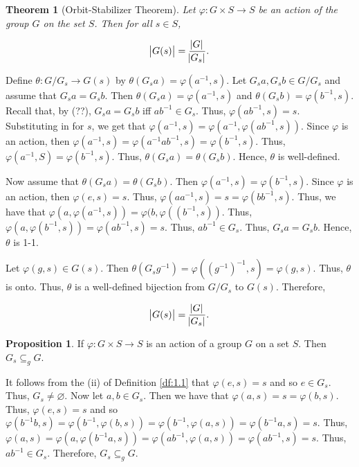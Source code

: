 \documentclass{article}
\makeatletter
\newtheorem{theorem}{Theorem}[section]
\theoremstyle{definition}
\newtheorem{prop}{Proposition}[section]
\theoremstyle{remark}
\let\oldproofname=\proofname
\renewcommand{\proofname}{\bf{\textit{\oldproofname}}}
\theoremstyle{definition}
\renewenvironment{proof}[1][\proofname]{\par
  \pushQED{\qed}%
  \normalfont \topsep6\p@\@plus6\p@\relax
  \list{}{\leftmargin=0mm
          \rightmargin=0mm
          \settowidth{\itemindent}{\itshape#1}%
          \labelwidth=4mm
          \parsep=0pt \listparindent=0mm%
  }
  \item[\hskip\labelsep
        \itshape
    #1\@addpunct{.}]\ignorespaces
}{%
  \popQED\endlist\@endpefalse
}
\makeatother
\begin{document}
    \begin{theorem}[Orbit-Stabilizer Theorem]\label{thm:1.1}
        Let $\varphi\colon G\times S\rightarrow S$ be an action of the group $G$ on the set $S$. Then for all $s\in S$, 
        
        \begin{equation*}
            \abs{G(s)}=\frac{\abs{G}}{\abs{G_s}}.
        \end{equation*}
    \end{theorem}
        \begin{proof}
            Define $\theta\colon G/G_s\rightarrow G(s)$ by $\theta(G_sa)=\varphi(a^{-1},s)$. Let $G_sa,G_sb\in G/G_s$ and assume that $G_sa=G_sb$. Then $\theta(G_sa)=\varphi(a^{-1},s)$ and $\theta(G_sb)=\varphi(b^{-1},s)$. Recall that, by (??), $G_sa=G_sb$ iff $ab^{-1}\in G_s$. Thus, $\varphi(ab^{-1},s)=s$. Substituting in for $s$, we get that $\varphi(a^{-1},s)=\varphi(a^{-1},\varphi(ab^{-1},s))$. Since $\varphi$ is an action, then $\varphi(a^{-1},s)=\varphi(a^{-1}ab^{-1},s)=\varphi(b^{-1},s)$. Thus, $\varphi(a^{-1}, S)=\varphi(b^{-1},s)$. Thus, $\theta(G_sa)=\theta(G_sb)$. Hence, $\theta$ is well-defined.\par\hspace{4mm} Now assume that $\theta(G_sa)=\theta(G_sb)$. Then $\varphi(a^{-1},s)=\varphi(b^{-1},s)$. Since $\varphi$ is an action, then $\varphi(e,s)=s$. Thus, $\varphi(aa^{-1},s)=s=\varphi(bb^{-1},s)$. Thus, we have that $\varphi(a,\varphi(a^{-1},s))=\varphi(b,\varphi((b^{-1},s))$. Thus, $\varphi(a,\varphi(b^{-1},s))=\varphi(ab^{-1},s)=s$. Thus, $ab^{-1}\in G_s$.  Thus, $G_sa=G_sb$. Hence, $\theta$ is 1-1.\par\hspace{4mm} Let $\varphi(g,s)\in G(s)$. Then $\theta(G_sg^{-1})=\varphi((g^{-1})^{-1},s)=\varphi(g,s)$. Thus, $\theta$ is onto. Thus, $\theta$ is a well-defined bijection from $G/G_s$ to $G(s)$. Therefore, 
            
            \begin{equation*}
                \abs{G(s)}=\frac{\abs{G}}{\abs{G_s}}.
            \end{equation*}
        \end{proof}
        
    \newpage
        
    \begin{prop}\label{prop:1.16}
        If $\varphi\colon G\times S\rightarrow S$ is an action of a group $G$ on a set $S$. Then $G_s\subseteq_g G$.
    \end{prop}
        \begin{proof}
            It follows from the (ii) of Definition \ref{df:1.1} that $\varphi(e,s)=s$ and so $e\in G_s$. Thus, $G_s\neq\varnothing$. Now let $a,b\in G_s$. Then we have that $\varphi(a,s)=s=\varphi(b,s)$. Thus, $\varphi(e,s)=s$ and so $\varphi(b^{-1}b,s)=\varphi(b^{-1},\varphi(b,s))=\varphi(b^{-1},\varphi(a,s))=\varphi(b^{-1}a,s)=s$. Thus, $\varphi(a,s)=\varphi(a,\varphi(b^{-1}a,s))=\varphi(ab^{-1},\varphi(a,s))=\varphi(ab^{-1},s)=s$. Thus, $ab^{-1}\in G_s$. Therefore, $G_s\subseteq_g G$.
        \end{proof}
            
\end{document}
